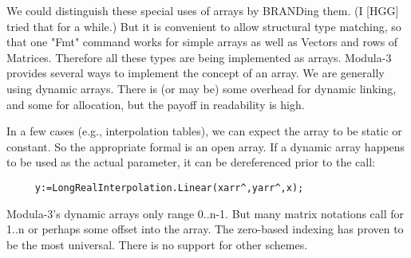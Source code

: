 We could distinguish these special uses of arrays by
BRANDing them.  (I [HGG] tried that for a while.)
But it is convenient to allow structural type matching,
so that one "Fmt" command works for simple arrays
as well as Vectors and rows of Matrices.
Therefore all these types are being implemented as arrays.
Modula-3 provides several ways to
implement the concept of an array.
We are generally using dynamic arrays.
There is (or may be) some overhead for
dynamic linking, and some for allocation,
but the payoff in readability is high.

In a few cases (e.g., interpolation tables),
we can expect the array to be static or constant.
So the appropriate formal is an open array.
If a dynamic array happens to be used as the actual parameter,
it can be dereferenced prior to the call:

\begin{tt} \begin{verbatim}
     y:=LongRealInterpolation.Linear(xarr^,yarr^,x);
\end{verbatim} \end{tt}

Modula-3's dynamic arrays only range 0..n-1.
But many matrix notations call for 1..n or
perhaps some offset into the array.
The zero-based indexing has proven to be the most universal.
There is no support for other schemes.
